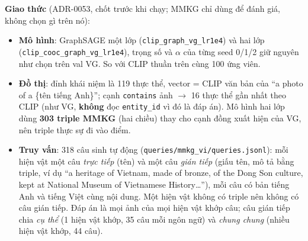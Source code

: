 \documentclass[12pt, a4paper]{article}
\newcommand{\code}[1]{\texttt{#1}}
\begin{document}
\textbf{Giao thức} (ADR-0053, chốt trước khi chạy; MMKG chỉ dùng để đánh giá, không chọn gì trên nó):
\begin{itemize}[leftmargin=*]
\item \textbf{Mô hình}: GraphSAGE một lớp (\code{clip\_\allowbreak graph\_\allowbreak vg\_\allowbreak lr1e4}) và hai lớp (\code{clip\_\allowbreak cooc\_\allowbreak graph\_\allowbreak vg\_\allowbreak lr1e4}), trọng số và $\alpha$ của từng seed 0/1/2 giữ nguyên như chọn trên val VG. So với CLIP thuần trên cùng 100 ứng viên.
\item \textbf{Đồ thị}: đỉnh khái niệm là 119 thực thể, vector = CLIP văn bản của ``a photo of a \{tên tiếng Anh\}''; cạnh \code{contains} ảnh $\to$ 16 thực thể gần nhất theo CLIP (như VG, \textbf{không} đọc \code{entity\_id} vì đó là đáp án). Mô hình hai lớp dùng \textbf{303 triple MMKG} (hai chiều) thay cho cạnh đồng xuất hiện của VG, nên triple thực sự đi vào điểm.
\item \textbf{Truy vấn}: 318 câu sinh tự động (\code{queries/mmkg\_vi/queries.jsonl}): mỗi hiện vật một câu \emph{trực tiếp} (tên) và một câu \emph{gián tiếp} (giấu tên, mô tả bằng triple, ví dụ ``a heritage of Vietnam, made of bronze, of the Dong Son culture, kept at National Museum of Vietnamese History\dots''), mỗi câu có bản tiếng Anh và tiếng Việt cùng nội dung. Một hiện vật không có triple nên không có câu gián tiếp. Đáp án là mọi ảnh của mọi hiện vật khớp câu; câu gián tiếp chia \emph{cụ thể} (1 hiện vật khớp, 35 câu mỗi ngôn ngữ) và \emph{chung chung} (nhiều hiện vật khớp, 44 câu).
\end{itemize}
\end{document}
